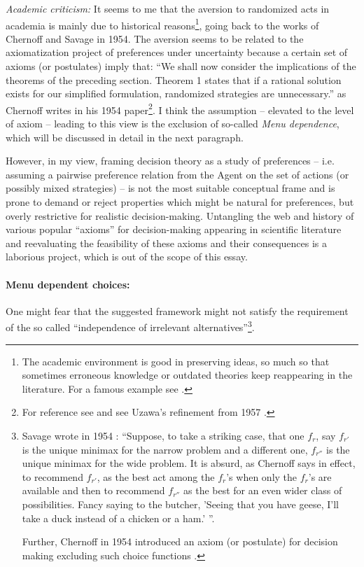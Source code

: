 \documentclass{article}
\begin{document}
{\it Academic criticism:}
It seems to me that the aversion to randomized acts in academia is mainly due to historical reasons\footnote{The academic environment is good in preserving ideas, so much so that sometimes erroneous knowledge or outdated theories keep reappearing in the literature. For a famous example see \cite{blog:ElectronCharge,speach:FeynmanCargoCultScience}.}, going back to the works of Chernoff and Savage in 1954.
The aversion seems to be related to the axiomatization project of preferences under uncertainty because a certain set of axioms (or postulates) imply that: ``We shall now consider the implications of the theorems of the preceding section. Theorem 1 states that if a rational solution exists for our simplified formulation, randomized strategies are unnecessary.'' as Chernoff writes in his 1954 paper\footnote{For reference see \cite{paper:Chernoff1954} and see Uzawa's refinement from 1957 \cite{paper:Uzawa1957}.}. 
I think the assumption -- elevated to the level of axiom -- leading to this view is the exclusion of so-called \emph{Menu dependence}, which will be discussed in detail in the next paragraph. 

However, in my view, framing decision theory as a study of preferences -- i.e. assuming a pairwise preference relation from the Agent on the set of actions (or possibly mixed strategies) -- is not the most suitable conceptual frame and is prone to demand or reject properties which might be natural for preferences, but overly restrictive for realistic decision-making.
Untangling the web and history of various popular ``axioms'' for decision-making appearing in scientific literature and reevaluating the feasibility of these axioms and their consequences is a laborious project, which is out of the scope of this essay.

\paragraph{Menu dependent choices:}
One might fear that the suggested framework might not satisfy the requirement of the so called ``independence of irrelevant alternatives''\footnote{Savage wrote in 1954 \cite{book:Savage}:
``Suppose, to take a striking case, that one $f_r$, say $f_{r'}$ is the unique minimax for the narrow problem and a different one, $f_{r''}$ is the unique minimax for the wide problem. It is absurd, as Chernoff says in effect, to recommend $f_{r'}$, as the best act among the $f_r$'s when only the $f_r$'s are available and then to recommend $f_{r''}$ as the best for an even wider class of possibilities. Fancy saying to the butcher, 'Seeing that you have geese, I'll take a duck instead of a chicken or a ham.' ''. 

Further, Chernoff in 1954 introduced an axiom (or postulate) for decision making excluding such choice functions \cite{paper:Chernoff1954}.}.
\end{document}
